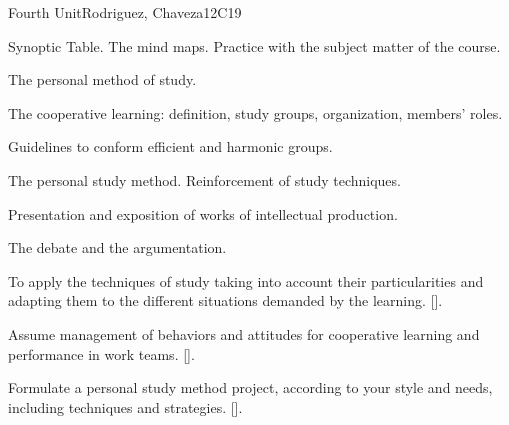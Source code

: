 \begin{syllabus}
\begin{unit}{}{Fourth Unit}{Rodriguez, Chaveza}{12}{C19}
\begin{topics}
        \item Synoptic Table. The mind maps. Practice with the subject matter of the course.
        \item The personal method of study.
        \item The cooperative learning: definition, study groups, organization, members' roles.
        \item Guidelines to conform efficient and harmonic groups.
        \item The personal study method. Reinforcement of study techniques.
        \item Presentation and exposition of works of intellectual production.
        \item The debate and the argumentation.
\end{topics}
\begin{learningoutcomes}
        \item To apply the techniques of study taking into account their particularities and adapting them to the different situations demanded by the learning. [\Usage].
        \item Assume management of behaviors and attitudes for cooperative learning and performance in work teams. [\Usage].
        \item Formulate a personal study method project, according to your style and needs, including techniques and strategies. [\Usage].
\end{learningoutcomes}
\end{unit}

\begin{coursebibliography}
\end{coursebibliography}

\end{syllabus}
